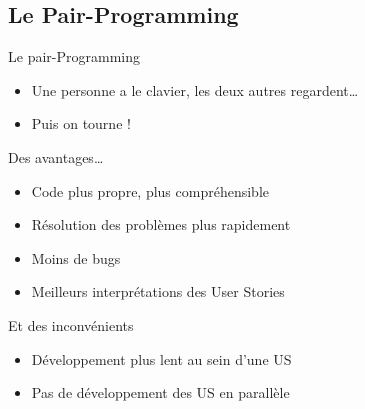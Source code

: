 	\subsection{Le Pair-Programming}%
	\begin{frame}{Le pair-Programming}
		\begin{itemize}
			\item Une personne a le clavier, les deux autres regardent…
			\item Puis on tourne !
		\end{itemize}
		\vfill
		\pause
		\begin{exampleblock}{Des avantages…}
			\begin{itemize}
				\item Code plus propre, plus compréhensible
				\item Résolution des problèmes plus rapidement
				\item Moins de bugs
				\item Meilleurs interprétations des User Stories 
			\end{itemize}
	\end{exampleblock}
		\pause
	\vfill
	\begin{alertblock}{Et des inconvénients}
	\begin{itemize}
		\item Développement plus lent au sein d'une US 
		\item Pas de développement des US en parallèle
	\end{itemize}
	\end{alertblock}
	\end{frame}
	
